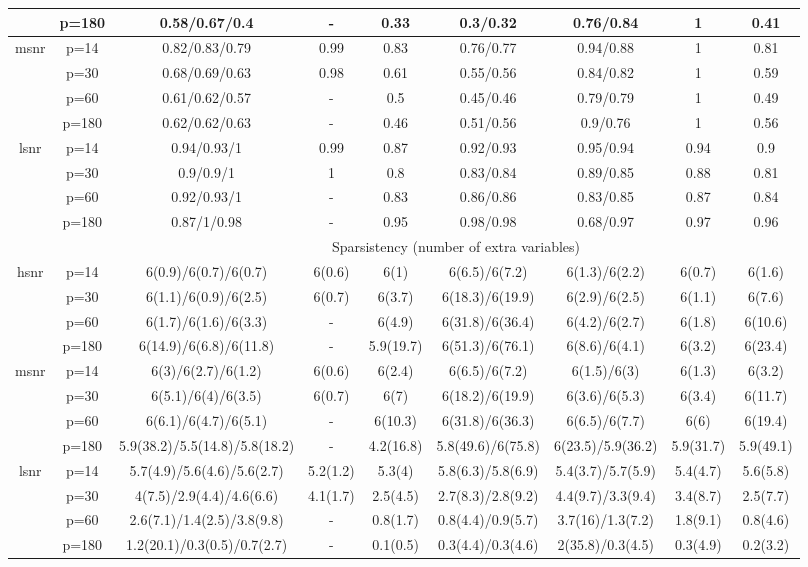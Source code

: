 \begin{table}[ht]
{\begin{tabular}{|c|c|ccccccc|}
   & p=180 & 0.58/0.67/0.4 & - & 0.33 & 0.3/0.32 & 0.76/0.84 & 1 & 0.41 \\ 
  \midrule\multirow{4}[2]{*}{msnr} & p=14 & 0.82/0.83/0.79 & 0.99 & 0.83 & 0.76/0.77 & 0.94/0.88 & 1 & 0.81 \\ 
   & p=30 & 0.68/0.69/0.63 & 0.98 & 0.61 & 0.55/0.56 & 0.84/0.82 & 1 & 0.59 \\ 
   & p=60 & 0.61/0.62/0.57 & - & 0.5 & 0.45/0.46 & 0.79/0.79 & 1 & 0.49 \\ 
   & p=180 & 0.62/0.62/0.63 & - & 0.46 & 0.51/0.56 & 0.9/0.76 & 1 & 0.56 \\ 
  \midrule\multirow{4}[2]{*}{lsnr} & p=14 & 0.94/0.93/1 & 0.99 & 0.87 & 0.92/0.93 & 0.95/0.94 & 0.94 & 0.9 \\ 
   & p=30 & 0.9/0.9/1 & 1 & 0.8 & 0.83/0.84 & 0.89/0.85 & 0.88 & 0.81 \\ 
   & p=60 & 0.92/0.93/1 & - & 0.83 & 0.86/0.86 & 0.83/0.85 & 0.87 & 0.84 \\ 
   & p=180 & 0.87/1/0.98 & - & 0.95 & 0.98/0.98 & 0.68/0.97 & 0.97 & 0.96 \\ 
   \midrule 
 \multicolumn{1}{|c}{} &       & \multicolumn{7}{c|}{Sparsistency (number of extra variables)} \\
\midrule\multirow{4}[2]{*}{hsnr} & p=14 & 6(0.9)/6(0.7)/6(0.7) & 6(0.6) & 6(1) & 6(6.5)/6(7.2) & 6(1.3)/6(2.2) & 6(0.7) & 6(1.6) \\ 
   & p=30 & 6(1.1)/6(0.9)/6(2.5) & 6(0.7) & 6(3.7) & 6(18.3)/6(19.9) & 6(2.9)/6(2.5) & 6(1.1) & 6(7.6) \\ 
   & p=60 & 6(1.7)/6(1.6)/6(3.3) & - & 6(4.9) & 6(31.8)/6(36.4) & 6(4.2)/6(2.7) & 6(1.8) & 6(10.6) \\ 
   & p=180 & 6(14.9)/6(6.8)/6(11.8) & - & 5.9(19.7) & 6(51.3)/6(76.1) & 6(8.6)/6(4.1) & 6(3.2) & 6(23.4) \\ 
  \midrule\multirow{4}[2]{*}{msnr} & p=14 & 6(3)/6(2.7)/6(1.2) & 6(0.6) & 6(2.4) & 6(6.5)/6(7.2) & 6(1.5)/6(3) & 6(1.3) & 6(3.2) \\ 
   & p=30 & 6(5.1)/6(4)/6(3.5) & 6(0.7) & 6(7) & 6(18.2)/6(19.9) & 6(3.6)/6(5.3) & 6(3.4) & 6(11.7) \\ 
   & p=60 & 6(6.1)/6(4.7)/6(5.1) & - & 6(10.3) & 6(31.8)/6(36.3) & 6(6.5)/6(7.7) & 6(6) & 6(19.4) \\ 
   & p=180 & 5.9(38.2)/5.5(14.8)/5.8(18.2) & - & 4.2(16.8) & 5.8(49.6)/6(75.8) & 6(23.5)/5.9(36.2) & 5.9(31.7) & 5.9(49.1) \\ 
  \midrule\multirow{4}[2]{*}{lsnr} & p=14 & 5.7(4.9)/5.6(4.6)/5.6(2.7) & 5.2(1.2) & 5.3(4) & 5.8(6.3)/5.8(6.9) & 5.4(3.7)/5.7(5.9) & 5.4(4.7) & 5.6(5.8) \\ 
   & p=30 & 4(7.5)/2.9(4.4)/4.6(6.6) & 4.1(1.7) & 2.5(4.5) & 2.7(8.3)/2.8(9.2) & 4.4(9.7)/3.3(9.4) & 3.4(8.7) & 2.5(7.7) \\ 
   & p=60 & 2.6(7.1)/1.4(2.5)/3.8(9.8) & - & 0.8(1.7) & 0.8(4.4)/0.9(5.7) & 3.7(16)/1.3(7.2) & 1.8(9.1) & 0.8(4.6) \\ 
   & p=180 & 1.2(20.1)/0.3(0.5)/0.7(2.7) & - & 0.1(0.5) & 0.3(4.4)/0.3(4.6) & 2(35.8)/0.3(4.5) & 0.3(4.9) & 0.2(3.2) \\ 
   \bottomrule 
\end{tabular}
}
\end{table}
